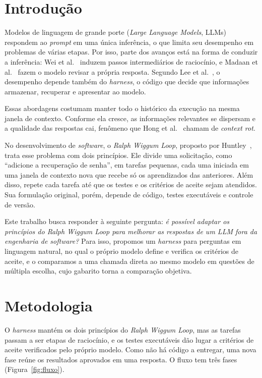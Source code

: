 \documentclass[a4paper,10pt, twocolumn]{article}
\begin{document}
\section{Introdução}

Modelos de linguagem de grande porte (\textit{Large Language Models}, LLMs) respondem ao \textit{prompt} em uma única inferência, o que limita seu desempenho em problemas de várias etapas. Por isso, parte dos avanços está na forma de conduzir a inferência: Wei et al.~\cite{wei2022chain} induzem passos intermediários de raciocínio, e Madaan et al.~\cite{madaan2023selfrefine} fazem o modelo revisar a própria resposta. Segundo Lee et al.~\cite{lee2026metaharness}, o desempenho depende também do \textit{harness}, o código que decide que informações armazenar, recuperar e apresentar ao modelo.

Essas abordagens costumam manter todo o histórico da execução na mesma janela de contexto. Conforme ela cresce, as informações relevantes se dispersam e a qualidade das respostas cai, fenômeno que Hong et al.~\cite{hong2025context} chamam de \textit{context rot}.

No desenvolvimento de \textit{software}, o \textit{Ralph Wiggum Loop}, proposto por Huntley~\cite{huntley}, trata esse problema com dois princípios. Ele divide uma solicitação, como \enquote{adicione a recuperação de senha}, em tarefas pequenas, cada uma iniciada em uma janela de contexto nova que recebe só os aprendizados das anteriores. Além disso, repete cada tarefa até que os testes e os critérios de aceite sejam atendidos. Sua formulação original, porém, depende de código, testes executáveis e controle de versão.

Este trabalho busca responder à seguinte pergunta: \emph{é possível adaptar os princípios do Ralph Wiggum Loop para melhorar as respostas de um LLM fora da engenharia de software?} Para isso, propomos um \textit{harness} para perguntas em linguagem natural, no qual o próprio modelo define e verifica os critérios de aceite, e o comparamos a uma chamada direta ao mesmo modelo em questões de múltipla escolha, cujo gabarito torna a comparação objetiva.

\section{Metodologia}

O \textit{harness} mantém os dois princípios do \textit{Ralph Wiggum Loop}, mas as tarefas passam a ser etapas de raciocínio, e os testes executáveis dão lugar a critérios de aceite verificados pelo próprio modelo. Como não há código a entregar, uma nova fase reúne os resultados aprovados em uma resposta. O fluxo tem três fases (Figura~\ref{fig:fluxo}).
\end{document}
